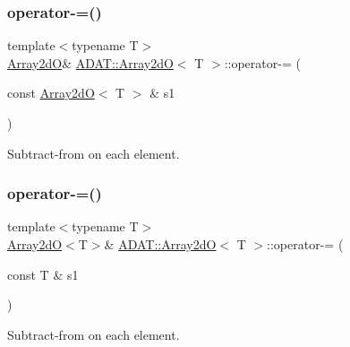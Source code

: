 \subsubsection{\texorpdfstring{operator-\/=()}{operator-=()}\hspace{0.1cm}{\footnotesize\ttfamily [2/4]}}
{\footnotesize\ttfamily template$<$typename T$>$ \\
\mbox{\hyperlink{classADAT_1_1Array2dO}{Array2dO}}\& \mbox{\hyperlink{classADAT_1_1Array2dO}{A\+D\+A\+T\+::\+Array2dO}}$<$ T $>$\+::operator-\/= (\begin{DoxyParamCaption}\item[{const \mbox{\hyperlink{classADAT_1_1Array2dO}{Array2dO}}$<$ T $>$ \&}]{s1 }\end{DoxyParamCaption})\hspace{0.3cm}{\ttfamily [inline]}}



Subtract-\/from on each element. 

\mbox{\label{classADAT_1_1Array2dO_a5facf357c8c8f28555fe851dce2d039c}} 
\subsubsection{\texorpdfstring{operator-\/=()}{operator-=()}\hspace{0.1cm}{\footnotesize\ttfamily [3/4]}}
{\footnotesize\ttfamily template$<$typename T$>$ \\
\mbox{\hyperlink{classADAT_1_1Array2dO}{Array2dO}}$<$T$>$\& \mbox{\hyperlink{classADAT_1_1Array2dO}{A\+D\+A\+T\+::\+Array2dO}}$<$ T $>$\+::operator-\/= (\begin{DoxyParamCaption}\item[{const T \&}]{s1 }\end{DoxyParamCaption})\hspace{0.3cm}{\ttfamily [inline]}}



Subtract-\/from on each element. 

\mbox{\label{classADAT_1_1Array2dO_a5facf357c8c8f28555fe851dce2d039c}} 
